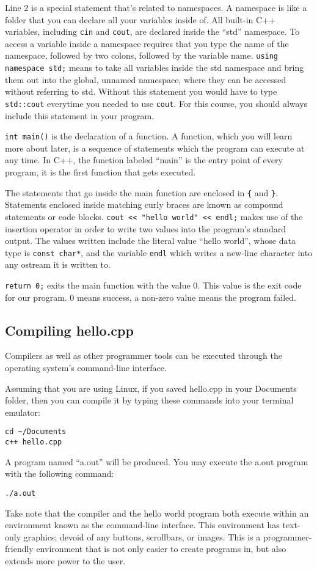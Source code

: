 \documentclass[a4paper,12pt]{article}
\begin{document}
Line 2 is a special statement that's related to namespaces. A namespace is like a folder that you can declare all your variables inside of. All built-in C++ variables, including \texttt{cin} and \texttt{cout}, are declared inside the ``std'' namespace. To access a variable inside a namespace requires that you type the name of the namespace, followed by two colons, followed by the variable name. \texttt{using namespace std;} means to take all variables inside the std namespace and bring them out into the global, unnamed namespace, where they can be accessed without referring to std. Without this statement you would have to type \texttt{std::cout} everytime you needed to use \texttt{cout}. For this course, you should always include this statement in your program.

\texttt{int main()} is the declaration of a function. A function, which you will learn more about later, is a sequence of statements which the program can execute at any time. In C++, the function labeled ``main'' is the entry point of every program, it is the first function that gets executed. 

The statements that go inside the main function are enclosed in \texttt{\{} and \texttt{\}}. Statements enclosed inside matching curly braces are known as compound statements or code blocks. 
\texttt{cout << "hello world" << endl;} makes use of the insertion operator in order to write two values into the program's standard output. The values written include the literal value ``hello world'', whose data type is \texttt{const char*}, and the variable \texttt{endl} which writes a new-line character into any ostream it is written to.

\texttt{return 0;} exits the main function with the value 0. This value is the exit code for our program. 0 means success, a non-zero value means the program failed.

\subsection*{Compiling hello.cpp}

Compilers as well as other programmer tools can be executed through the operating system's command-line interface. 

Assuming that you are using Linux, if you saved hello.cpp in your Documents folder, then you can compile it by typing these commands into your terminal emulator:
\begin{lstlisting}
cd ~/Documents
c++ hello.cpp
\end{lstlisting}
A program named ``a.out'' will be produced.  You may execute the a.out program with the following command:
\begin{lstlisting}
./a.out
\end{lstlisting}

Take note that the compiler and the hello world program both execute within an environment known as the command-line interface. This environment has text-only graphics; devoid of any buttons, scrollbars, or images. This is a programmer-friendly environment that is not only easier to create programs in, but also extends more power to the user. 
\end{document}
